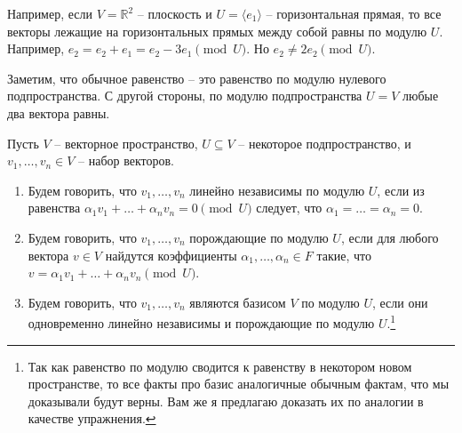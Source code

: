 Например, если $V = \mathbb R^2$ -- плоскость и $U = \langle e_1\rangle$ -- горизонтальная прямая, то все векторы лежащие на горизонтальных прямых между собой равны по модулю $U$. Например, $e_2 = e_2 + e_1 = e_2 - 3 e_1 \pmod U$. Но $e_2 \neq 2 e_2 \pmod U$.

Заметим, что обычное равенство -- это равенство по модулю нулевого подпространства. С другой стороны, по модулю подпространства $U = V$ любые два вектора равны.

\begin{definition}
Пусть $V$ -- векторное пространство,  $U\subseteq V$ -- некоторое подпространство, и $v_1,\ldots,v_n\in V$ -- набор векторов.
\begin{enumerate}
\item Будем говорить, что $v_1,\ldots,v_n$ линейно независимы по модулю $U$, если из равенства $\alpha_1 v_1 + \ldots + \alpha_n v_n = 0 \pmod U$ следует, что $\alpha_1 = \ldots = \alpha_ n = 0$.

\item Будем говорить, что $v_1, \ldots, v_n$ порождающие по модулю $U$, если для любого вектора $v\in V$ найдутся коэффициенты $\alpha_1,\ldots,\alpha_n\in F$ такие, что $v = \alpha_1 v_1 + \ldots + \alpha_n v_n\pmod U$.

\item Будем говорить, что $v_1,\ldots,v_n$ являются базисом $V$ по модулю $U$, если они одновременно линейно независимы и порождающие по модулю $U$.\footnote{Так как равенство по модулю сводится к равенству в некотором новом пространстве, то все факты про базис аналогичные обычным фактам, что мы доказывали будут верны. Вам же я предлагаю доказать их по аналогии в качестве упражнения.}
\end{enumerate}
\end{definition}

